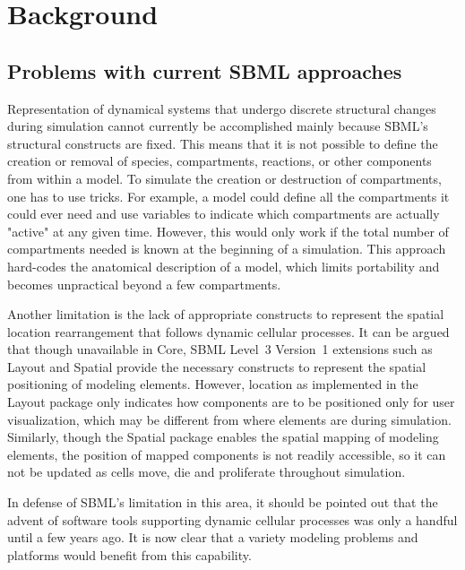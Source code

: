 
\section{ Background }
\label{sec:background}

\subsection{ Problems with current SBML approaches }
\label{subsec:problems}

Representation of dynamical systems that undergo discrete structural changes during simulation cannot currently be accomplished mainly because SBML's structural constructs are fixed. This means that it is not possible to define the creation or removal of species, compartments, reactions, or other components from within a model. To simulate the creation or destruction of compartments, one has to use tricks. For example, a model could define all the compartments it could ever need and use variables to indicate which compartments are actually "active" at any given time. However, this would only work if the total number of compartments needed is known at the beginning of a simulation. This approach hard-codes the anatomical description of a model, which limits portability and becomes unpractical beyond a few compartments. 

Another limitation is the lack of appropriate constructs to represent the spatial location rearrangement that follows dynamic cellular processes. It can be argued that though unavailable in Core, SBML Level~3 Version~1 extensions such as Layout and Spatial provide the necessary constructs to represent the spatial positioning of modeling elements. However, location as implemented in the Layout package only indicates how components are to be positioned only for user visualization, which may be different from where elements are during simulation. Similarly, though the Spatial package enables the spatial mapping of modeling elements, the position of mapped components is not readily accessible, so it can not be updated as cells move, die and proliferate throughout simulation.

In defense of SBML's limitation in this area, it should be pointed out that the advent of software tools supporting dynamic cellular processes was only a handful until a few years ago. It is now clear that a variety modeling problems and platforms would benefit from this capability. 

